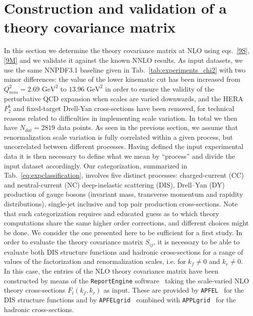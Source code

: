     \section{Construction and validation of a theory covariance matrix}
    \label{sec:validation}
    In this section we determine the theory covariance matrix at NLO using eqs.~\eqref{9S}, \eqref{9M}
    and we validate it against the known NNLO results.
    As input datasets, we use the same NNPDF3.1 baseline given in Tab.~\ref{tab:experiments_chi2} with two minor differences:
    the value of the lower kinematic cut has been increased from $Q^2_{min} = 2.69 \,\,\text{GeV}^2$ to $13.96 \,\, \text{GeV}^2$
    in order to ensure the validity of the perturbative QCD expansion when scales are varied downwards, 
    and the HERA $F^b_2$ and fixed-target Drell-Yan cross-sections have been removed, 
    for technical reasons related to difficulties in implementing scale variation. 
    In total we then have $N_{dat} = 2819$ data points.
    As seen in the previous section, we assume that renormalization scale variation is fully correlated within 
    a given process, but uncorrelated between different processes.
    Having defined the input experimental data it is then necessary to define what we mean by ``process'' and
    divide the input dataset accordingly.
    Our categorization, summarized in Tab.~\ref{eq:expclassification}, involves five distinct processes:  charged-current (CC)
    and neutral-current (NC) deep-inelastic scattering (DIS),
    Drell–Yan (DY) production of gauge bosons (invariant mass,
    transverse momentum and rapidity distributions), single-jet
    inclusive and top pair production cross-sections.
    Note that such categorization requires and educated guess as to which theory computations share the same higher order
    corrections, and different choices might be done. 
    We consider the one presented here to be sufficient for a first study. 
    In order to evaluate the theory covariance matrix $S_{ij}$, it is necessary
    to be able to evaluate both DIS structure functions and hadronic
    cross-sections for a range of values of the factorization
    and renormalization scales, i.e. for $k_f \neq  0$ and $k_r \neq 0$.
    In this case, the entries of the NLO theory covariance matrix have been 
    constructed
    by means of the {\tt ReportEngine} software~\cite{zahari_kassabov_2019_2571601}
    taking the
    scale-varied NLO theory cross-sections $\overline{F}_i(k_f,k_r)$  as input.
    These are provided 
    by {\tt APFEL}~\cite{Bertone:2013vaa} for the DIS structure functions
    and by {\tt APFELgrid}~\cite{Bertone:2016lga} combined with
    {\tt APPLgrid}~\cite{Carli:2010rw} for the hadronic
    cross-sections.

